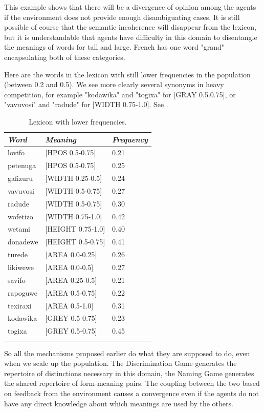 This example shows that there will be a divergence of 
opinion among the agents if the environment does not 
provide enough 
disambiguating cases. It is still possible of course that 
the semantic incoherence will disappear from the lexicon, 
but it is understandable that agents have difficulty 
in this domain to disentangle the meanings of words for 
tall and large. French has one word "grand" encapsulating
both of these categories.

Here are the words in the lexicon with still lower 
frequencies in the population (between 0.2 and 0.5). We see
more clearly several synonyms in heavy competition, for example 
"kodawika" and "togixa" for [GRAY 0.5.0.75], or 
"vavuvosi" and "radude" for [WIDTH 0.75-1.0]. See . 
\begin{table}
\begin{center}
\begin{tabular}{ l  l  l }
\lsptoprule
{\itshape Word}&{\itshape Meaning} & {\itshape Frequency} \\ \midrule
lovifo & [HPOS 0.5-0.75] & 0.21 \\ 
petenuga & [HPOS 0.5-0.75] & 0.25 \\ 
gafizuru & [WIDTH 0.25-0.5] & 0.24 \\ 
vavuvosi & [WIDTH 0.5-0.75] & 0.27 \\ 
radude & [WIDTH 0.5-0.75] & 0.30 \\ 
wofetizo & [WIDTH 0.75-1.0] & 0.42 \\ 
wetami & [HEIGHT 0.75-1.0] & 0.40 \\ 
donadewe & [HEIGHT 0.5-0.75] & 0.41 \\ 
turede & [AREA 0.0-0.25] & 0.26 \\ 
likiwewe & [AREA 0.0-0.5] & 0.27 \\ 
savifo & [AREA 0.25-0.5] & 0.21 \\ 
rapoguwe & [AREA 0.5-0.75] & 0.22 \\ 
texiraxi & [AREA 0.5-1.0] & 0.31 \\ 
kodawika & [GREY 0.5-0.75] & 0.23 \\ 
togixa & [GREY 0.5-0.75] & 0.45 \\ 
\lspbottomrule
\end{tabular}
\caption{\label{tab:comp} Lexicon with lower frequencies.}
\end{center}
\end{table}

So all the mechanisms proposed earlier 
do what they are supposed to do, even when we 
scale up the population. The Discrimination 
Game generates the repertoire of distinctions 
necessary in this domain, the Naming Game generates
the shared repertoire of form-meaning pairs. The 
coupling between the two based on feedback from 
the environment causes a convergence even if the
agents do not have any direct knowledge about 
which meanings are used by the others. 

